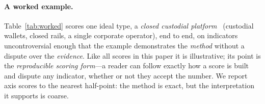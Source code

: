 \documentclass[11pt]{article}
\theoremstyle{definition}
\begin{document}
\paragraph{A worked example.} Table~\ref{tab:worked} scores one ideal type, a
\emph{closed custodial platform}~\cite{srnicek2017} (custodial wallets, closed rails, a single corporate
operator), end to end, on indicators uncontroversial enough that the example
demonstrates the \emph{method} without a dispute over the \emph{evidence}. Like all
scores in this paper it is illustrative; its point is the \emph{reproducible scoring
form}---a reader can follow exactly how a score is built and dispute any indicator,
whether or not they accept the number. We report axis scores to the nearest
half-point: the method is exact, but the interpretation it supports is coarse.
\end{document}
